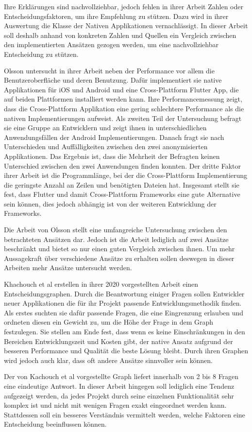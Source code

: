 Ihre Erklärungen sind nachvollziehbar, jedoch fehlen in ihrer Arbeit Zahlen oder Entscheidungsfaktoren, um ihre Empfehlung zu stützen. Dazu wird in ihrer Auswertung die Klasse der Nativen Applikationen vernachlässigt. In dieser Arbeit soll deshalb anhand von konkreten Zahlen und Quellen ein Vergleich zwischen den implementierten Ansätzen gezogen werden, um eine nachvollziehbar Entscheidung zu stützen.

Olsson \cite{Olsson_2020} untersucht in ihrer Arbeit neben der Performance vor allem die Benutzeroberfläche und deren Benutzung. Dafür implementiert sie native Applikationen für iOS und Android und eine Cross-Plattform Flutter App, die auf beiden Plattformen installiert werden kann. Ihre Performancemessung zeigt, dass die Cross-Plattform Applikation eine gering schlechtere Performance als die nativen Implementierungen aufweist. Als zweiten Teil der Untersuchung befragt sie eine Gruppe an Entwicklern und zeigt ihnen in unterschiedlichen Anwendungsfällen der Android Implementierungen. Danach fragt sie nach Unterschieden und Auffälligkeiten zwischen den zwei anonymisierten Applikationen. Das Ergebnis ist, dass die Mehrheit der Befragten keinen Unterschied zwischen den zwei Anwendungen finden konnten. Der dritte Faktor ihrer Arbeit ist die Programmlänge, bei der die Cross-Plattform Implementierung die geringste Anzahl an Zeilen und benötigten Dateien hat. Insgesamt stellt sie fest, dass Flutter und damit Cross-Plattform Frameworks eine gute Alternative sein können, dies jedoch abhängig ist von der weiteren Entwicklung der Frameworks.

Die Arbeit von Olsson stellt eine umfangreiche Untersuchung zwischen den betrachteten Ansätzen dar. Jedoch ist die Arbeit lediglich auf zwei Ansätze beschränkt und bietet so nur einen guten Vergleich zwischen ihnen. Um mehr Aussagekraft über verschiedene Ansätze zu erhalten sollen deswegen in dieser Arbeiten mehr Ansätze untersucht werden. 

Khachouch et al \cite{IEEE_Khackouch_Al} erstellen in ihrer 2020 vorgestellten Arbeit einen Entscheidungsgraphen. Durch die Beantwortung einiger Fragen sollen Entwickler neuer Applikationen die für ihr Projekt passende Entwicklungsmethodik finden. Als erstes suchten sie dafür passende Fragen, die eine Eingrenzung erlauben und ordneten diesen ein Gewicht zu, um die Höhe der Frage in dem Graph festzulegen. Sie stellen am Ende fest, dass wenn es keine Einschränkungen in den Bereichen Entwicklungszeit und Kosten gibt, der native Ansatz aufgrund der besseren Performance und Qualität die beste Lösung bleibt. Durch ihren Graphen wird jedoch auch klar, dass oft andere Ansätze sinnvoller sein können.

Der von Kachouch et al vorgestellte Graph liefert innerhalb von 2 bis 8 Fragen eine eindeutige Antwort. In dieser Arbeit hingegen soll lediglich eine Tendenz aufgezeigt werden, da jedes Projekt durch seine einzelnen Funktionalität sehr komplex ist und nicht mit wenigen Fragen exakt eingeordnet werden kann. Stattdessen soll ein besseres Verständnis vermittelt werden, welche Faktoren eine Entscheidung beeinflussen können. 